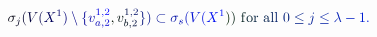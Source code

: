 \documentclass[12pt]{article}
\begin{document}
\makeatletter
\renewcommand*{\@textcolor}[3]{%
  \protect\leavevmode
  \begingroup
    \color#1{#2}#3%
  \endgroup
}
\makeatother
\begin{displaymath}
\mathcolor[RGB]{0,0,15}{\sigma} _ { \mathcolor[RGB]{0,0,30}{j} } \mathcolor[RGB]{0,0,45}{(} \mathcolor[RGB]{0,0,60}{V} \mathcolor[RGB]{0,0,75}{(} \mathcolor[RGB]{0,0,90}{X} ^ { \mathcolor[RGB]{0,0,105}{1} } \mathcolor[RGB]{0,0,120}{)} \mathcolor[RGB]{0,0,135}{\setminus} \mathcolor[RGB]{0,0,150}{\{} \mathcolor[RGB]{0,0,165}{v} _ { \mathcolor[RGB]{0,0,180}{a} \mathcolor[RGB]{0,0,195}{,} \mathcolor[RGB]{0,0,210}{2} } ^ { \mathcolor[RGB]{0,0,225}{1} \mathcolor[RGB]{0,0,240}{,} \mathcolor[RGB]{0,0,255}{2} } \mathcolor[RGB]{0,15,0}{,} \mathcolor[RGB]{0,15,15}{v} _ { \mathcolor[RGB]{0,15,30}{b} \mathcolor[RGB]{0,15,45}{,} \mathcolor[RGB]{0,15,60}{2} } ^ { \mathcolor[RGB]{0,15,75}{1} \mathcolor[RGB]{0,15,90}{,} \mathcolor[RGB]{0,15,105}{2} } \mathcolor[RGB]{0,15,120}{\}} \mathcolor[RGB]{0,15,135}{)} \mathcolor[RGB]{0,15,150}{\subset} \mathcolor[RGB]{0,15,165}{\sigma} _ { \mathcolor[RGB]{0,15,180}{s} } \mathcolor[RGB]{0,15,195}{(} \mathcolor[RGB]{0,15,210}{V} \mathcolor[RGB]{0,15,225}{(} \mathcolor[RGB]{0,15,240}{X} ^ { \mathcolor[RGB]{0,15,255}{1} } \mathcolor[RGB]{0,30,0}{)} \mathcolor[RGB]{0,30,15}{)} \mathrm { ~ \mathcolor[RGB]{0,30,30}{f} \mathcolor[RGB]{0,30,45}{o} \mathcolor[RGB]{0,30,60}{r} ~ \mathcolor[RGB]{0,30,75}{a} \mathcolor[RGB]{0,30,90}{l} \mathcolor[RGB]{0,30,105}{l} ~ } \mathcolor[RGB]{0,30,120}{0} \mathcolor[RGB]{0,30,135}{\leq} \mathcolor[RGB]{0,30,150}{j} \mathcolor[RGB]{0,30,165}{\leq} \mathcolor[RGB]{0,30,180}{\lambda} \mathcolor[RGB]{0,30,195}{-} \mathcolor[RGB]{0,30,210}{1} \mathcolor[RGB]{0,30,225}{.}
\end{displaymath}
\end{document}
